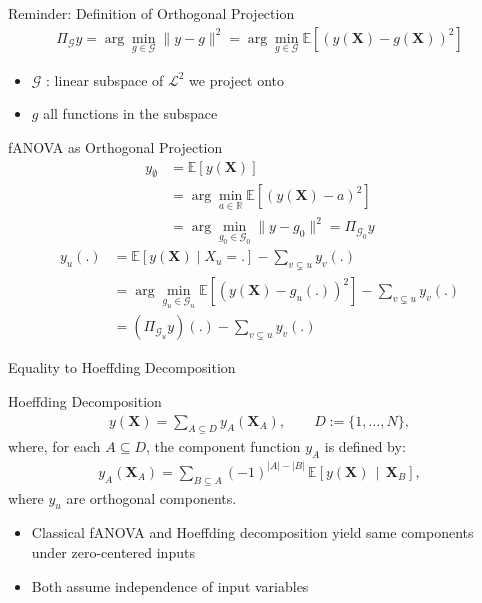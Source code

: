 
\begin{frame}{Reminder: Definition of Orthogonal Projection} %
  \begin{align*}
    \Pi_{\mathcal{G}}y = \arg\min_{g \in \mathcal{G}} \|y - g\|^2
= \arg\min_{g \in \mathcal{G}} \mathbb{E}[(y(\boldsymbol{X}) - g(\boldsymbol{X}))^2]
\end{align*}
  \begin{itemize}
    \item $\mathcal{G}$ : linear subspace of $\mathcal{L}^2$ we project onto
    \item $g$ all functions in the subspace
  \end{itemize}
\end{frame}

\begin{frame}{fANOVA as Orthogonal Projection} %
\begin{align*}
    y_{\emptyset}
    &= \mathbb{E}[y(\boldsymbol{X})] \\ 
    &= \arg \min_{a \in \mathbb{R}} \mathbb{E}[(y(\boldsymbol{X}) - a)^2] \\ 
    &= \arg \min_{g_0 \in \mathcal{G}_0} \|y - g_0\|^2
    = \Pi_{\mathcal{G}_0}y
\end{align*}
\begin{align*}
    y_u(.) 
    &= \mathbb{E}[y(\boldsymbol{X}) \mid X_{u} = .] - \sum_{v \subsetneq u} y_v(.) \\ 
    &= \arg \min_{g_u \in \mathcal{G}_u} \mathbb{E}[(y(\boldsymbol{X}) - g_u(.))^2] - \sum_{v \subsetneq u} y_v(.) \\ 
    &= (\Pi_{\mathcal{G}_u}y)(.) - \sum_{v \subsetneq u} y_v(.)
\end{align*}
\end{frame}

\begin{frame}{Equality to Hoeffding Decomposition} %
  \begin{block}{Hoeffding Decomposition}
    \begin{align}
    y(\boldsymbol{X})
=
\sum_{A \subseteq D} 
y_A(\boldsymbol{X}_A),
\qquad
D := \{1,\dots,N\},
\end{align}
where, for each $A \subseteq D$, the component function $y_A$ is defined by:
\begin{align}\label{eq:hoeffding_components}
    y_A(\boldsymbol{X}_A)
=
\sum_{B \subseteq A}
(-1)^{|A|-|B|}
\,\mathbb{E}\!\left[
  y(\boldsymbol{X}) 
  \,\middle|\, 
  \boldsymbol{X}_B
\right],
\end{align}
  where $y_u$ are orthogonal components.
  \end{block}
  \begin{itemize}
    \item Classical fANOVA and Hoeffding decomposition yield same components under zero-centered inputs
    \item Both assume independence of input variables
  \end{itemize}
  
\end{frame}


